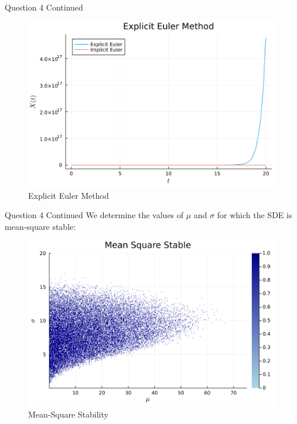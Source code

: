 \documentclass[compress,12pt]{beamer}
\begin{document}
\begin{frame}{Question 4 Continued}
      \begin{figure}[H]
            \centering
            \includegraphics[scale=0.04]{imgs/4explicit_euler.png}
            \caption{Explicit Euler Method}
            \label{fig:4b}
      \end{figure}
\end{frame}

\begin{frame}{Question 4 Continued}
      We determine the values of $\mu$ and $\sigma$ for which the SDE is mean-square stable:
      \begin{figure}
            \centering
            \includegraphics[scale=0.03]{imgs/4mean_square_stable.png}
            \caption{Mean-Square Stability}
            \label{fig:4c}
      \end{figure}

 
\end{frame}
\end{document}
